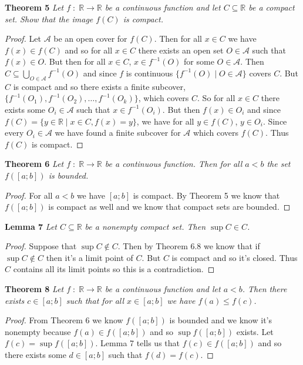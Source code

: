 \documentclass{article}
\begin{document}
\begin{flushleft}
\textbf{Theorem 5}
\textsl{Let $f \; : \; \mathbb{R} \rightarrow \mathbb{R}$ be a continuous function and let $C \subseteq \mathbb{R}$ be a compact set. Show that the image $f(C)$ is compact.}
\begin{proof}
Let $\mathcal{A}$ be an open cover for $f(C)$. Then for all $x \in C$ we have $f(x) \in f(C)$ and so for all $x \in C$ there exists an open set $O \in \mathcal{A}$ such that $f(x) \in O$. But then for all $x \in C$, $x \in f^{-1}(O)$ for some $O \in \mathcal{A}$. Then $C \subseteq \bigcup_{O \in \mathcal{A}} f^{-1} (O)$ and since $f$ is continuous $\{f^{-1} (O) \mid O \in \mathcal{A}\}$ covers $C$. But $C$ is compact and so there exists a finite subcover, $\{f^{-1} (O_1), f^{-1} (O_2), \dots ,f^{-1}(O_k)\}$, which covers $C$. So for all $x \in C$ there exists some $O_i \in \mathcal{A}$ such that $x \in f^{-1} (O_i)$. But then $f(x) \in O_i$ and since $f(C) =\{y \in \mathbb{R} \mid x \in C, f(x)=y\}$, we have for all $y \in f(C)$, $y \in O_i$. Since every $O_i \in \mathcal{A}$ we have found a finite subcover for $\mathcal{A}$ which covers $f(C)$. Thus $f(C)$ is compact.
\end{proof}

\textbf{Theorem 6}
\textsl{Let $f \; : \; \mathbb{R} \rightarrow \mathbb{R}$ be a continuous function. Then for all $a<b$ the set $f([a;b])$ is bounded.}
\begin{proof}
For all $a<b$ we have $[a;b]$ is compact. By Theorem 5 we know that $f([a;b])$ is compact as well and we know that compact sets are bounded.
\end{proof}

\textbf{Lemma 7}
\textsl{Let $C \subseteq \mathbb{R}$ be a nonempty compact set. Then $\sup C \in C$.}
\begin{proof}
Suppose that $\sup C \notin C$. Then by Theorem 6.8 we know that if $\sup C \notin C$ then it's a limit point of $C$. But $C$ is compact and so it's closed. Thus $C$ contains all its limit points so this is a contradiction.
\end{proof}

\textbf{Theorem 8}
\textsl{Let $f \; : \; \mathbb{R} \rightarrow \mathbb{R}$ be a continuous function and let $a < b$. Then there exists $c \in [a;b]$ such that for all $x \in [a;b]$ we have $f(a) \leq f(c)$.}
\begin{proof}
From Theorem 6 we know $f([a;b])$ is bounded and we know it's nonempty because $f(a) \in f([a;b])$ and so $\sup f([a;b])$ exists. Let $f(c) = \sup f([a;b])$. Lemma 7 tells us that $f(c) \in f([a;b])$ and so there exists some $d \in [a;b]$ such that $f(d) = f(c)$.
\end{proof}


\end{flushleft}
\end{document}
